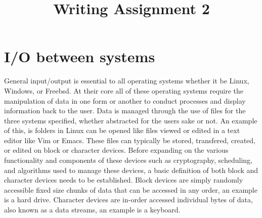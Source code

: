 \documentclass[letterpaper,10pt,titlepage]{IEEEtran}
\author{\name}
\title{Writing Assignment 2}
\begin{document}
\maketitle
\hrulefill

\section{I/O between systems}
General input/output is essential to all operating systems whether it be Linux, Windows, or Freebsd. At their core all of these operating systems require the manipulation of data in one form or another to conduct processes and display information back to the user. Data is managed through the use of files for the three systems specified, whether abstracted for the users sake or not. An example of this, is folders in Linux can be opened like files viewed or edited in a text editor like Vim or Emacs. These files can typically be stored, transfered, created, or edited on block or character devices. Before expanding on the various functionality and components of these devices such as cryptography, scheduling, and algorithms used to manage these devices, a basic definition of both block and character devices needs to be established. Block devices are simply randomly accessible fixed size chunks of data that can be accessed in any order, an example is a hard drive. Character devices are in-order accessed individual bytes of data, also known as a data streams, an example is a keyboard\cite{Linux_book}.\\
\end{document}
